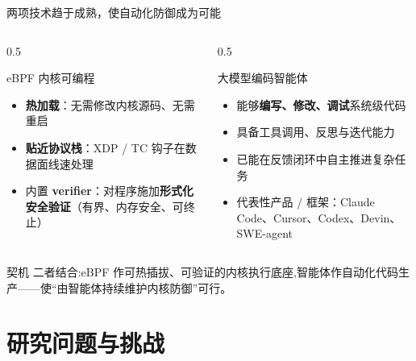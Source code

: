 \documentclass[aspectratio=169,10pt]{beamer}
\begin{document}
\begin{frame}{两项技术趋于成熟，使自动化防御成为可能}
    \begin{columns}[T]
        \begin{column}{0.5\textwidth}
            \begin{exampleblock}{eBPF 内核可编程}
                \begin{itemize}
                    \item \textbf{热加载}：无需修改内核源码、无需重启
                    \item \textbf{贴近协议栈}：XDP / TC 钩子在数据面线速处理
                    \item 内置 \textbf{verifier}：对程序施加\textbf{形式化安全验证}（有界、内存安全、可终止）\supercite{gershuni2019prevail}
                \end{itemize}
            \end{exampleblock}
        \end{column}
        \begin{column}{0.5\textwidth}
            \begin{exampleblock}{大模型编码智能体}
                \begin{itemize}
                    \item 能够\textbf{编写、修改、调试}系统级代码
                    \item 具备工具调用、反思与迭代能力
                    \item 已能在反馈闭环中自主推进复杂任务\supercite{romeraparedes2024funsearch,novikov2025alphaevolve}
                    \item 代表性产品 / 框架：Claude Code、Cursor、Codex、Devin、SWE-agent\supercite{anthropic2025claudecode,yang2024sweagent}
                \end{itemize}
            \end{exampleblock}
        \end{column}
    \end{columns}
    \vspace{0.5em}
    \begin{block}{契机}
        二者结合:eBPF 作可热插拔、可验证的内核执行底座,智能体作自动化代码生产——使“由智能体持续维护内核防御”可行。
    \end{block}
\end{frame}


\section{研究问题与挑战}
\end{document}
